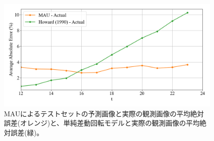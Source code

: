           \begin{figure}[htbp]
            \centering
            \includegraphics[width=\textwidth]{figures/exp1/error_dr.png}
            \caption{MAUによるテストセットの予測画像と実際の観測画像の平均絶対誤差(オレンジ)と、単純差動回転モデルと実際の観測画像の平均絶対誤差(緑)。}
            \label{fig:exp1_sdr_line}
          \end{figure}
          
